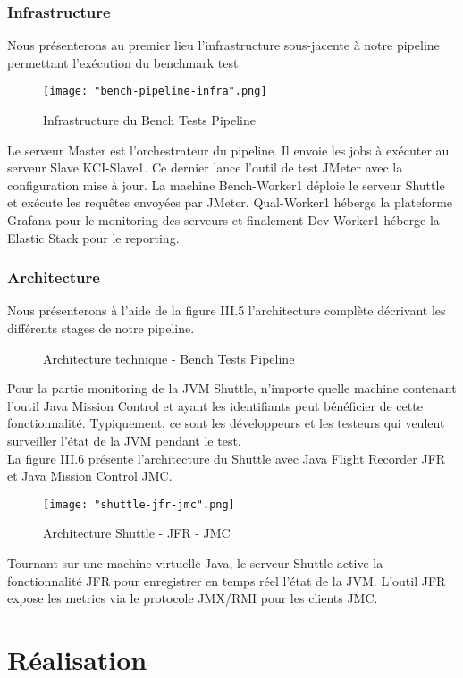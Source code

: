 \begin{spacing}{1.2}
\subsubsection{Infrastructure}
Nous présenterons au premier lieu l'infrastructure sous-jacente à notre pipeline permettant l'exécution du benchmark test.  
\begin{figure}[!ht]\centering
\texttt{[image: "bench-pipeline-infra".png]} 
\caption{Infrastructure du Bench Tests Pipeline}
\label{fig:fig4}
\end{figure}
\FloatBarrier
Le serveur Master est l'orchestrateur du pipeline. Il envoie les jobs à exécuter au serveur Slave KCI-Slave1. Ce dernier lance l'outil de test JMeter avec la configuration mise à jour. La machine Bench-Worker1 déploie le serveur Shuttle et exécute les requêtes envoyées par JMeter. Qual-Worker1 héberge la plateforme Grafana pour le monitoring des serveurs et finalement Dev-Worker1 héberge la Elastic Stack pour le reporting. \\
\subsubsection{Architecture} 
Nous présenterons à l'aide de la figure III.5 l'architecture complète décrivant les différents stages de notre pipeline.
\begin{figure}[!ht]\centering
{}
\caption{Architecture technique - Bench Tests Pipeline}
\label{fig:fig5}
\end{figure}
\FloatBarrier
Pour la partie monitoring de la JVM Shuttle, n'importe quelle machine contenant l'outil Java Mission Control et ayant les identifiants peut bénéficier de cette fonctionnalité. Typiquement, ce sont les développeurs et les testeurs qui veulent surveiller l'état de la JVM pendant le test. \\ 
La figure III.6 présente l'architecture du Shuttle avec Java Flight Recorder JFR et Java Mission Control JMC. 
\begin{figure}[!ht]\centering
\texttt{[image: "shuttle-jfr-jmc".png]} 
\caption{Architecture Shuttle - JFR - JMC}
\label{fig:fig6}
\end{figure}
\FloatBarrier
Tournant sur une machine virtuelle Java, le serveur Shuttle active la fonctionnalité JFR pour enregistrer en temps réel l'état de la JVM. L'outil JFR expose les metrics via le protocole JMX/RMI pour les clients JMC.
\section{Réalisation}

\end{spacing}
